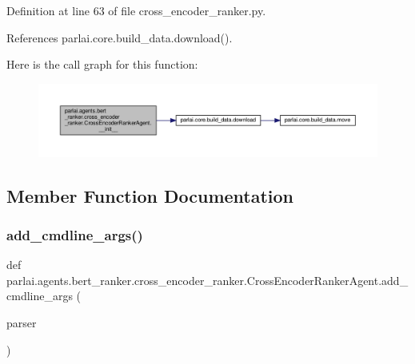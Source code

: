 Definition at line 63 of file cross\+\_\+encoder\+\_\+ranker.\+py.



References parlai.\+core.\+build\+\_\+data.\+download().

Here is the call graph for this function\+:
\nopagebreak
\begin{figure}[H]
\begin{center}
\leavevmode
\includegraphics[width=350pt]{classparlai_1_1agents_1_1bert__ranker_1_1cross__encoder__ranker_1_1CrossEncoderRankerAgent_ab7f5e55dec9f12dc4e4dccc48c682e63_cgraph}
\end{center}
\end{figure}


\subsection{Member Function Documentation}
\mbox{\label{classparlai_1_1agents_1_1bert__ranker_1_1cross__encoder__ranker_1_1CrossEncoderRankerAgent_a15c4f37715a216f5a4f37f5dbcb446f5}} 
\subsubsection{\texorpdfstring{add\+\_\+cmdline\+\_\+args()}{add\_cmdline\_args()}}
{\footnotesize\ttfamily def parlai.\+agents.\+bert\+\_\+ranker.\+cross\+\_\+encoder\+\_\+ranker.\+Cross\+Encoder\+Ranker\+Agent.\+add\+\_\+cmdline\+\_\+args (\begin{DoxyParamCaption}\item[{}]{parser }\end{DoxyParamCaption})\hspace{0.3cm}{\ttfamily [static]}}



